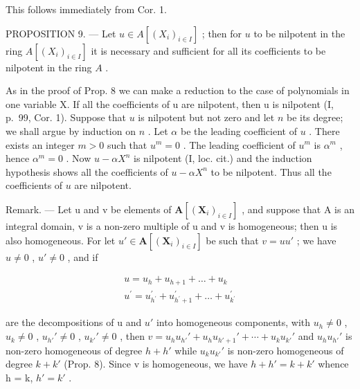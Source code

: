 This follows immediately from Cor. 1.

PROPOSITION 9. --- Let \(u \in A[(X_i)_{i \in I}]\) ; then for \(u\) to be nilpotent in the ring \(A[(X_i)_{i \in I}]\) it is necessary and sufficient for all its coefficients to be nilpotent in the ring \(A\) .

As in the proof of Prop. 8 we can make a reduction to the case of polynomials in one variable X. If all the coefficients of u are nilpotent, then u is nilpotent (I, p.~99, Cor. 1). Suppose that \(u\) is nilpotent but not zero and let \(n\) be its degree; we shall argue by induction on \(n\) . Let \(\alpha\) be the leading coefficient of \(u\) . There exists an integer \(m > 0\) such that \(u^m = 0\) . The leading coefficient of \(u^m\) is \(\alpha^m\) , hence \(\alpha^m = 0\) . Now \(u - \alpha X^n\) is nilpotent (I, loc. cit.) and the induction hypothesis shows all the coefficients of \(u - \alpha X^n\) to be nilpotent. Thus all the coefficients of \(u\) are nilpotent.

Remark. --- Let u and v be elements of \(\mathbf{A}[(\mathbf{X}_{i})_{i\in I}]\) , and suppose that A is an integral domain, v is a non-zero multiple of u and v is homogeneous; then u is also homogeneous. For let \(u'\in\mathbf{A}[(\mathbf{X}_{i})_{i\in I}]\) be such that \(v=uu'\) ; we have \(u\neq0\) , \(u'\neq0\) , and if

\[
\begin{array}{c} u = u _ {h} + u _ {h + 1} + \dots + u _ {k} \\ u ^ {\prime} = u _ {h ^ {\prime}} ^ {\prime} + u _ {h ^ {\prime} + 1} ^ {\prime} + \dots + u _ {k ^ {\prime}} ^ {\prime} \end{array}
\]

are the decompositions of u and \(u'\) into homogeneous components, with \(u_{h} \neq 0\) , \(u_{k} \neq 0\) , \(u_{h'}' \neq 0\) , \(u_{k'}' \neq 0\) , then \(v = u_{h} u_{h'}' + u_{h} u_{h'+1}' + \cdots + u_{k} u_{k'}'\) and \(u_{h} u_{h'}'\) is non-zero homogeneous of degree \(h + h'\) while \(u_{k} u_{k'}'\) is non-zero homogeneous of degree \(k + k'\) (Prop. 8). Since v is homogeneous, we have \(h + h' = k + k'\) whence h = k, \(h' = k'\) .

